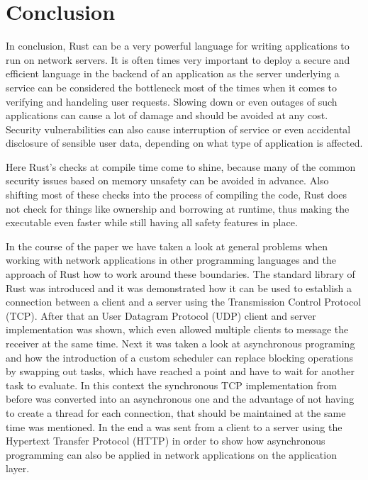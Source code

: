 
\section{Conclusion}
In conclusion, Rust can be a very powerful language for writing applications to run on network servers. It is often
times very important to deploy a secure and efficient language in the backend of an application as the server
underlying a service can be considered the bottleneck most of the times when it comes to verifying and handeling user
requests. Slowing down or even outages of such applications can cause a lot of damage and should be avoided at any
cost. Security vulnerabilities can also cause interruption of service or even accidental disclosure of sensible user
data, depending on what type of application is affected.

Here Rust's checks at compile time come to shine, because many of the common security issues based on memory unsafety
can be avoided in advance. Also shifting most of these checks into the process of compiling the code, Rust does not
check for things like ownership and borrowing at runtime, thus making the executable even faster while still having
all safety features in place.

In the course of the paper we have taken a look at general problems when working with network applications in other
programming languages and the approach of Rust how to work around these boundaries. The standard library of Rust was
introduced and it was demonstrated how it can be used to establish a connection between a client and a server using the
Transmission Control Protocol (TCP). After that an User Datagram Protocol (UDP) client and server implementation was
shown, which even allowed multiple clients to message the receiver at the same time. Next it was taken a look at
asynchronous programing and how the introduction of a custom scheduler can replace blocking operations by swapping
out tasks, which have reached a  point and have to wait for another task to evaluate. In this context the
synchronous TCP implementation from before was converted into an asynchronous one and the advantage of not having to
create a thread for each connection, that should be maintained at the same time was mentioned. In the end a
 was sent from a client to a server using the Hypertext Transfer Protocol (HTTP) in order to show how
asynchronous programming can also be applied in network applications on the application layer.

